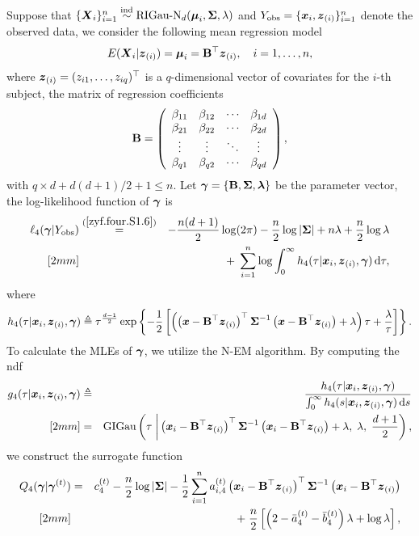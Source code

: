 Suppose that $\{{\boldsymbol{X}}_i\}_{i=1}^n \stackrel{{\rm ind}}{\sim} \mbox{RIGau-N}_d({\boldsymbol{\mu}}_i, {\mbox{\boldmath$\Sigma$}}, \lambda)$ and $Y_{\rm obs} = \{{\boldsymbol{x}}_i, {\boldsymbol{z}}_{(i)}\}_{i=1}^n$ denote the observed data, we consider the following mean regression model
$$
    E({\boldsymbol{X}}_i | {\boldsymbol{z}}_{(i)}) = {\boldsymbol{\mu}}_i = {\bf B}^\top {\boldsymbol{z}}_{(i)}, \quad i = 1, \dots, n, 
$$
where ${\boldsymbol{z}}_{(i)} = (z_{i1}, \dots, z_{iq})^\top$ is a $q$-dimensional vector of covariates for the $i$-th subject, the matrix of regression coefficients
\begin{eqnarray*}
    {\bf B} = \left(
    \begin{array}{cccc}
        \beta_{11} & \beta_{12} & \cdots & \beta_{1d} \\ 
        \beta_{21} & \beta_{22} & \cdots & \beta_{2d} \\ 
        \vdots   & \vdots   & \ddots & \vdots   \\
        \beta_{q1} & \beta_{q2} & \cdots & \beta_{qd}
    \end{array}
    \right),
\end{eqnarray*}
with $q \times d + d(d + 1) / 2 + 1 \le n$. Let ${\boldsymbol{\gamma}} = \{ {\bf B}, {\mbox{\boldmath$\Sigma$}}, {\boldsymbol{\lambda}}\}$ be the parameter vector, the log-likelihood function of ${\boldsymbol{\gamma}}$ is
\begin{eqnarray*}
    \ell_4({\boldsymbol{\gamma}} | Y_{\rm obs}) &\stackrel{\rm (\ref{zyf.four.S1.6})}{=}& -\frac{n(d + 1)}{2} \log(2\pi) - \frac{n}{2} \log|{\mbox{\boldmath$\Sigma$}}| + n\lambda + \frac{n}{2} \log\lambda \\ [2mm]
    && +\; \sum_{i=1}^n \log \int_0^\infty h_4(\tau | {\boldsymbol{x}}_i, {\boldsymbol{z}}_{(i)}, {\boldsymbol{\gamma}}) \,\mbox{d} \tau,
\end{eqnarray*}
where 
$$
    h_4(\tau | {\boldsymbol{x}}_i, {\boldsymbol{z}}_{(i)}, {\boldsymbol{\gamma}}) \triangleq \tau^\frac{d - 1}{2} \exp\left\{-\frac{1}{2}\left[\left( \left({\boldsymbol{x}} - {\bf B}^\top {\boldsymbol{z}}_{(i)} \right)^\top {\mbox{\boldmath$\Sigma$}}^{-1} \left({\boldsymbol{x}} - {\bf B}^\top {\boldsymbol{z}}_{(i)} \right) + \lambda \right) \tau + \frac{\lambda}{\tau} \right]\right\}.
$$
To calculate the MLEs of ${\boldsymbol{\gamma}}$, we utilize the N-EM algorithm. By computing the ndf
\begin{eqnarray*}
    g_4(\tau | {\boldsymbol{x}}_i, {\boldsymbol{z}}_{(i)}, {\boldsymbol{\gamma}}) &\triangleq& \frac{h_4(\tau | {\boldsymbol{x}}_i, {\boldsymbol{z}}_{(i)}, {\boldsymbol{\gamma}})}{\int_0^\infty h_4(s | {\boldsymbol{x}}_i, {\boldsymbol{z}}_{(i)}, {\boldsymbol{\gamma}}) \,\mbox{d} s} \\ [2mm]
    &=& \mbox{GIGau}\left( \tau \;\bigg| \left({\boldsymbol{x}}_i - {\bf B}^\top{\boldsymbol{z}}_{(i)}\right)^\top {\mbox{\boldmath$\Sigma$}}^{-1} \left({\boldsymbol{x}}_i - {\bf B}^\top {\boldsymbol{z}}_{(i)}\right) + \lambda,\; \lambda,\; \frac{d + 1}{2}\right),
\end{eqnarray*}
we construct the surrogate function 
\begin{eqnarray*}
    Q_4({\boldsymbol{\gamma}} | {\boldsymbol{\gamma}}^{(t)}) &=& c^{(t)}_{4} - \frac{n}{2} \log|{\mbox{\boldmath$\Sigma$}}| - \frac{1}{2} \sum_{i=1}^n a^{(t)}_{i,4} \left({\boldsymbol{x}}_i - {\bf B}^\top {\boldsymbol{z}}_{(i)} \right)^\top {\mbox{\boldmath$\Sigma$}}^{-1} \left({\boldsymbol{x}}_i - {\bf B}^\top {\boldsymbol{z}}_{(i)} \right) \\ [2mm]
    && +\; \frac{n}{2} \left[ \left(2 - \bar{a}_{4}^{(t)} - \bar{b}_{4}^{(t)}\right) \lambda + \log\lambda \right],
\end{eqnarray*}

